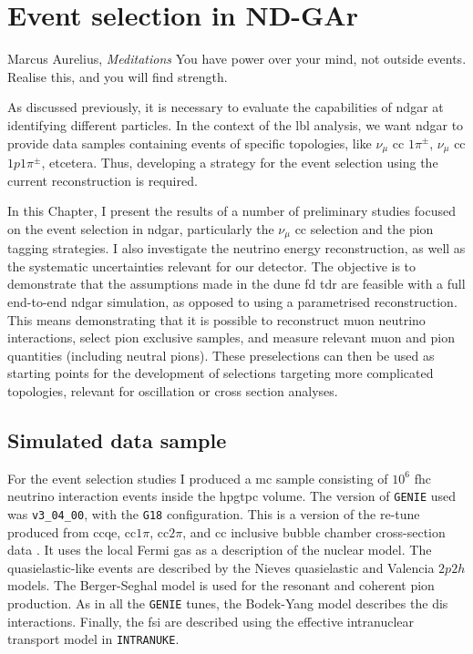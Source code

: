 \chapter{Event selection in ND-GAr}
\label{chapter:gar_selection}

\begin{chapquote}{Marcus Aurelius, \textit{Meditations}}
	You have power over your mind, not outside events. Realise this, and you will find strength.
\end{chapquote}

As discussed previously, it is necessary to evaluate the capabilities of \gls{ndgar} at identifying different particles. In the context of the \gls{lbl} analysis, we want \gls{ndgar} to provide data samples containing events of specific topologies, like $\nu_{\mu}$ \gls{cc} $1\pi^{\pm}$, $\nu_{\mu}$ \gls{cc} $1p1\pi^{\pm}$, etcetera. Thus, developing a strategy for the event selection using the current reconstruction is required.

In this Chapter, I present the results of a number of preliminary studies focused on the event selection in \gls{ndgar}, particularly the $\nu_{\mu}$ \gls{cc} selection and the pion tagging strategies. I also investigate the neutrino energy reconstruction, as well as the systematic uncertainties relevant for our detector. The objective is to demonstrate that the assumptions made in the \gls{dune} \gls{fd} \gls{tdr} \cite{DUNE2020TDR2} are feasible with a full end-to-end \gls{ndgar} simulation, as opposed to using a parametrised reconstruction. This means demonstrating that it is possible to reconstruct muon neutrino interactions, select pion exclusive samples, and measure relevant muon and pion quantities (including neutral pions). These preselections can then be used as starting points for the development of selections targeting more complicated topologies, relevant for oscillation or cross section analyses.

\section{Simulated data sample}
\label{sec:gar_data}

For the event selection studies I produced a \gls{mc} sample consisting of $10^{6}$ \gls{fhc} neutrino interaction events inside the \gls{hpgtpc} volume. The version of \texttt{GENIE} used was \texttt{v3_04_00}, with the \texttt{G18} configuration. This is a version of the re-tune produced from \gls{cc}\gls{qe}, \gls{cc}$1\pi$, \gls{cc}$2\pi$, and \gls{cc} inclusive bubble chamber cross-section data \cite{GENIE2021}. It uses the local Fermi gas \cite{Chiang1989} as a description of the nuclear model. The quasielastic-like events are described by the Nieves quasielastic \cite{Nieves2004} and Valencia $2p2h$ \cite{Nieves2011} models. The Berger-Seghal model \cite{Berger2007,Berger2008} is used for the resonant and coherent pion production. As in all the \texttt{GENIE} tunes, the Bodek-Yang model \cite{Bodek2002} describes the \gls{dis} interactions. Finally, the \gls{fsi} are described using the effective intranuclear transport model in \texttt{INTRANUKE}.

